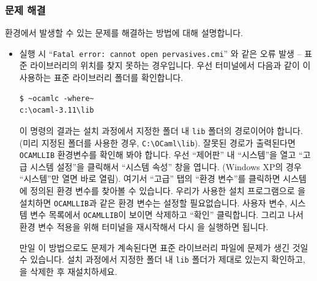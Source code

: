 \subsubsection{문제 해결}

\WINDOWS{} 환경에서 발생할 수 있는 \OCAML{} 문제를 해결하는 방법에 대해
설명합니다.

\begin{itemize}
\item \OCAML{} 실행 시 ``\texttt{Fatal error: cannot open pervasives.cmi}'' 와
  같은 오류 발생 -- \OCAML{} 표준 라이브러리의 위치를 찾지 못하는 경우입니다.
  우선 터미널에서 다음과 같이 \OCAML{}이 사용하는 표준 라이브러리
  폴더를 확인합니다.

  \begin{lstlisting}
$ ~ocamlc -where~
c:\ocaml-3.11\lib
  \end{lstlisting}

  이 명령의 결과는 설치 과정에서 지정한 폴더 내 \texttt{lib} 폴더의 경로이어야
  합니다. (미리 지정된 폴더를 사용한 경우,
  \texttt{C:\textbackslash{}OCaml\textbackslash{}lib}). 잘못된 경로가
  출력된다면 \texttt{OCAMLLIB} 환경변수를 확인해 봐야 합니다. 우선 ``제어판'' 내
  ``시스템''을 열고 ``고급 시스템 설정''을 클릭해서 ``시스템 속성'' 창을
  엽니다. (\textsf{Windows XP}의 경우 ``시스템''만 열면 바로 열림). 여기서
  ``고급'' 탭의 ``환경 변수''를 클릭하면 시스템에 정의된 환경 변수를 찾아볼 수
  있습니다. 우리가 사용한 설치 프로그램으로 \OCAML{}을 설치하면
  \texttt{OCAMLLIB}과 같은 환경 변수는 설정할 필요없습니다. 사용자 변수,
  시스템 변수 목록에서 \texttt{OCAMLLIB}이 보이면 삭제하고 ``확인''
  클릭합니다. 그리고 나서 환경 변수 적용을 위해 터미널을 재시작해서 다시
  \OCAML{}을 실행하면 됩니다.

  만일 이 방법으로도 문제가 계속된다면 표준 라이브러리 파일에 문제가 생긴 것일 수
  있습니다. 설치 과정에서 지정한 폴더 내 \texttt{lib} 폴더가 제대로 있는지
  확인하고, \OCAML{}을 삭제한 후 재설치하세요.
\end{itemize}

